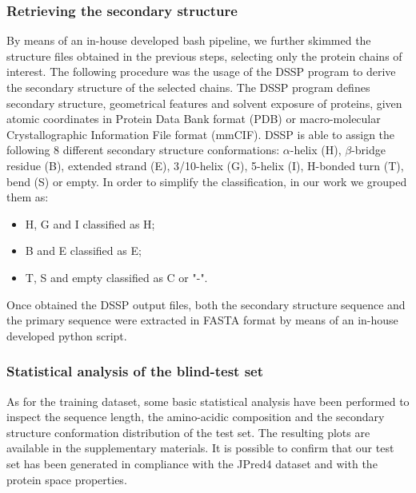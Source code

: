 \documentclass[nocrop]{bioinfo}
\begin{document}
\begin{methods}
\subsubsection{Retrieving the secondary structure}
By means of an in-house developed bash pipeline, we further skimmed the structure files obtained in the previous steps, selecting only the protein chains of interest. The following procedure was the usage of the DSSP program \citep{kabsch1983dictionary} to derive the secondary structure of the selected chains. The DSSP program defines secondary structure, geometrical features and solvent exposure of proteins, given atomic coordinates in Protein Data Bank format (PDB) or macro-molecular Crystallographic Information File format (mmCIF). DSSP is able to assign the following 8 different secondary structure conformations: $\alpha$-helix (H), $\beta$-bridge residue (B), extended strand (E), 3/10-helix (G), 5-helix (I), H-bonded turn (T), bend (S) or empty. In order to simplify the classification, in our work we grouped them as:
\begin{itemize}
    \item H, G and I classified as H;
    \item B and E classified as E;
    \item T, S and empty classified as C or "-".
\end{itemize}
Once obtained the DSSP output files, both the secondary structure sequence and the primary sequence were extracted in FASTA format by means of an in-house developed python script.
\subsubsection{Statistical analysis of the blind-test set}
As for the training dataset, some basic statistical analysis have been performed to inspect the sequence length, the amino-acidic composition and the secondary structure conformation distribution of the test set. The resulting plots are available in the supplementary materials. It is possible to confirm that our test set has been generated in compliance with the JPred4 dataset and with the protein space properties.

\end{methods}
\end{document}
